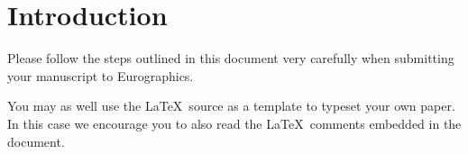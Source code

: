 \section{Introduction}

Please follow the steps outlined in this document very carefully when
submitting your manuscript to Eurographics.

You may as well use the \LaTeX\ source as a template to typeset your own
paper. In this case we encourage you to also read the \LaTeX\ comments
embedded in the document.



